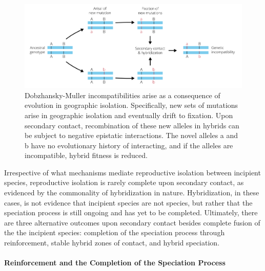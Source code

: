 \documentclass[
]{book}
\begin{document}
\begin{figure}
\includegraphics[width=1\linewidth]{images/dm-incomps} \caption{Dobzhansky-Muller incompatibilities arise as a consequence of evolution in geographic isolation. Specifically, new sets of mutations arise in geographic isolation and eventually drift to fixation. Upon secondary contact, recombination of these new alleles in hybrids can be subject to negative epistatic interactions. The novel alleles a and b have no evolutionary history of interacting, and if the alleles are incompatible, hybrid fitness is reduced.}\label{fig:dmincomp}
\end{figure}

Irrespective of what mechanisms mediate reproductive isolation between incipient species, reproductive isolation is rarely complete upon secondary contact, as evidenced by the commonality of hybridization in nature. Hybridization, in these cases, is not evidence that incipient species are not species, but rather that the speciation process is still ongoing and has yet to be completed. Ultimately, there are three alternative outcomes upon secondary contact besides complete fusion of the the incipient species: completion of the speciation process through reinforcement, stable hybrid zones of contact, and hybrid speciation.

\hypertarget{reinforcement-and-the-completion-of-the-speciation-process}{%
\paragraph*{Reinforcement and the Completion of the Speciation Process}\label{reinforcement-and-the-completion-of-the-speciation-process}}
\end{document}
